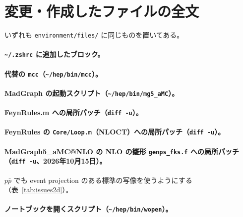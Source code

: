 \documentclass[a4paper,10pt]{ltjsarticle}
\begin{document}
\section{変更・作成したファイルの全文}\label{app:files}

いずれも \nolinkurl{environment/files/} に同じものを置いてある。

\paragraph{\texttt{\textasciitilde/.zshrc} に追加したブロック。}

\paragraph{代替の \texttt{mcc}（\texttt{\textasciitilde/hep/bin/mcc}）。}

\paragraph{MadGraph の起動スクリプト（\texttt{\textasciitilde/hep/bin/mg5\_aMC}）。}

\paragraph{FeynRules.m への局所パッチ（\texttt{diff -u}）。}

\paragraph{FeynRules の \texttt{Core/Loop.m}（NLOCT）への局所パッチ（\texttt{diff -u}）。}

\paragraph{MadGraph5\_aMC@NLO の NLO の雛形 \texttt{genps\_fks.f} への局所パッチ（\texttt{diff -u}、2026年10月15日）。}$p\bar p$ でも event projection のある標準の写像を使うようにする（表~\ref{tab:issues2d}）。

\paragraph{ノートブックを開くスクリプト（\texttt{\textasciitilde/hep/bin/wopen}）。}
\end{document}
